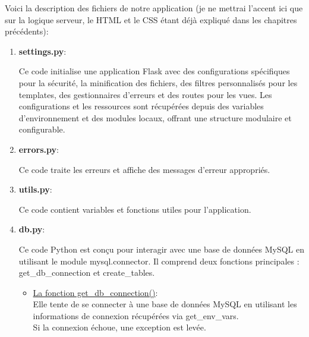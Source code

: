 \documentclass[a4paper,11pt]{article}
\begin{document}
                \bigskip
                \noindent Voici la description des fichiers de notre application (je ne mettrai l'accent ici que sur la logique serveur, le HTML et le CSS étant déjà expliqué dans les chapitres précédents):
                
                \begin{enumerate}
                    \item \textbf{settings.py}:
                        
                        
                        \noindent Ce code initialise une application Flask avec des configurations spécifiques pour la sécurité, la minification des fichiers, 
                        des filtres personnalisés pour les templates, des gestionnaires d'erreurs et des routes pour les vues. Les configurations et les ressources 
                        sont récupérées depuis des variables d'environnement et des modules locaux, offrant une structure modulaire et configurable.

                    \item \textbf{errors.py}:
                        
                        \noindent Ce code traite les erreurs et affiche des messages d'erreur appropriés.
                    
                    \item \textbf{utils.py}: 
                        
                        \noindent Ce code contient variables et fonctions utiles pour l'application.

                    \item \textbf{db.py}: 
                        
                        \noindent Ce code Python est conçu pour interagir avec une base de données MySQL en utilisant le module mysql.connector. 
                        Il comprend deux fonctions principales : get\_db\_connection et create\_tables.
                        
                        \begin{itemize}
                            \item \underline{La fonction get\_db\_connection()}: \\
                            \noindent Elle  tente de se connecter à une base de données MySQL en utilisant les informations de connexion récupérées via get\_env\_vars.\\
                            Si la connexion échoue, une exception est levée.


\end{itemize}
\end{enumerate}
\end{document}
